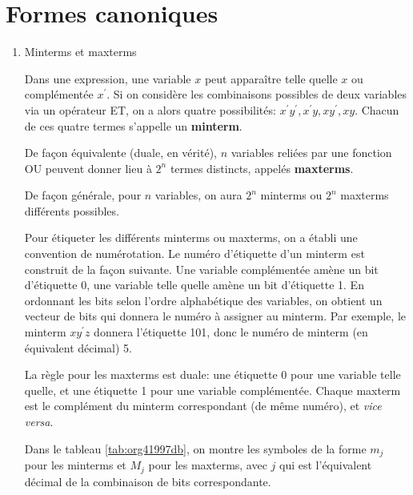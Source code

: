 \documentclass[letter, oneside]{book}
\begin{document}
\section{Formes canoniques}
\label{sec:org12a858d}

\begin{enumerate}
\item Minterms et maxterms
\label{sec:org999a84c}

Dans une expression, une variable \(x\) peut apparaître telle quelle
\(x\) ou complémentée \(x^\prime\). Si on considère les combinaisons
possibles de deux variables via un opérateur ET, on a alors quatre
possibilités: \(x^\prime y^\prime, x^\prime y, x y^\prime,x
y\). Chacun de ces quatre termes s'appelle un \textbf{minterm}.

De façon équivalente (duale, en vérité), \(n\) variables reliées par
une fonction OU peuvent donner lieu à \(2^n\) termes distincts,
appelés \textbf{maxterms}. 

De façon générale, pour \(n\) variables, on aura \(2^n\) minterms ou
\(2^n\) maxterms différents possibles.

Pour étiqueter les différents minterms ou maxterms, on a établi une
convention de numérotation. Le numéro d'étiquette d'un minterm est
construit de la façon suivante. Une variable complémentée amène un bit
d'étiquette 0, une variable telle quelle amène un bit d'étiquette 1.
En ordonnant les bits selon l'ordre alphabétique des variables, on
obtient un vecteur de bits qui donnera le numéro à assigner au
minterm.  Par exemple, le minterm \(x y^\prime z\) donnera l'étiquette
101, donc le numéro de minterm (en équivalent décimal) 5.

La règle pour les maxterms est duale: une étiquette 0 pour une
variable telle quelle, et une étiquette 1 pour une variable
complémentée. Chaque maxterm est le complément du minterm
correspondant (de même numéro), et \emph{vice versa}.

Dans le tableau \ref{tab:org41997db}, on montre les symboles de la forme
\(m_j\) pour les minterms et \(M_j\) pour les maxterms, avec \(j\) qui
est l'équivalent décimal de la combinaison de bits correspondante.


\end{enumerate}
\end{document}
